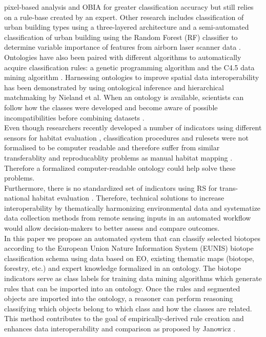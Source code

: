 \documentclass[authoryear, review,12pt,number]{elsarticle}
\begin{document}
pixel-based analysis and OBIA for greater classification accuracy but still
relies on a rule-base created by an expert. Other research includes
classification of urban building types using a three-layered architecture
\citep{diSciascio2013} and a semi-automated classification of urban building
using the Random Forest (RF) classifier to determine variable importance of
features from airborn laser scanner data \citep{Belgiu2014}. Ontologies have
also been paired with different algorithms to automatically acquire
classification rules: a genetic programming algorithm
\citep{Forestier2012470} and the C4.5 data mining algorithm
\citep{Sheeren2006ML}. Harnessing ontologies to improve spatial data
interoperability has been demonstrated by using ontological inference and
hierarchical matchmaking by Nieland et al. \citep{Nieland2015}  When an ontology
is available, scientists can follow how the classes were developed and become
aware of possible incompatibilities before combining datasets
\citep{Janowicz2012}.
\\
Even though researchers recently developed a number of indicators using
different sensors for habitat evaluation \citep{Nagendra2013}, classification
procedures and rulesets were not formalised to be computer readable and
therefore suffer from similar transferablity and reproducablity problems as
manual habitat mapping \citep{Arvor2013} \citep{Nieland2015}. Therefore a
formalized computer-readable ontology could help solve these problems.
\\
Furthermore, there is no standardized set of indicators
using RS for trans-national habitat evaluation \citep{Lucas2015}. Therefore,
technical solutions to increase interoperability by thematically harmonizing
environmental data and systematize data collection methods from remote sensing
inputs in an automated workflow would allow decision-makers to better assess and
compare outcomes.
\\
In this paper we propose an automated system that can
classify selected biotopes according to the European Union Nature Information
System (EUNIS) biotope classification schema using data based on EO, existing
thematic maps (biotope, forestry, etc.) and expert knowledge formalized in an
ontology.  The biotope indicators serve as class labels for training data mining
algorithms which generate rules that can be imported into an ontology. Once the
rules and segmented objects are imported into the ontology, a reasoner can
perform reasoning classifying which objects belong to which class and how the
classes are related. This method contributes to the goal of empirically-derived
rule creation and enhances data interoperability and comparison as proposed by
Janowicz \citep{Janowicz2012}.
\end{document}
